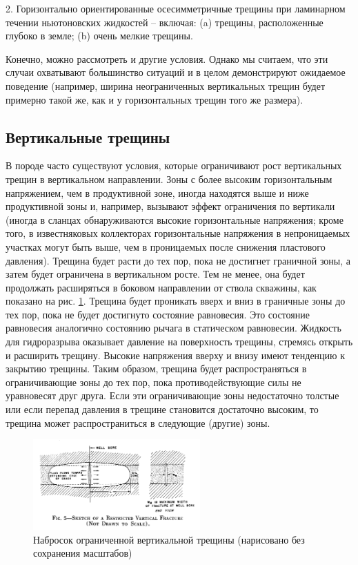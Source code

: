 \documentclass[a4paper, 12pt]{article}
\begin{document}
2. Горизонтально ориентированные осесимметричные трещины при ламинарном течении ньютоновских жидкостей -- включая: (a) трещины, расположенные глубоко в земле; (b) очень мелкие трещины.

Конечно, можно рассмотреть и другие условия.
Однако мы считаем, что эти случаи охватывают большинство ситуаций и в целом демонстрируют ожидаемое поведение
(например, ширина неограниченных вертикальных трещин будет примерно такой же, как и у горизонтальных трещин того же размера).

\subsection{Вертикальные трещины}

В породе часто существуют условия, которые ограничивают рост вертикальных трещин в вертикальном направлении.
Зоны с более высоким горизонтальным напряжением, чем в продуктивной зоне, иногда находятся выше и ниже продуктивной зоны и, например, вызывают эффект ограничения по вертикали
(иногда в сланцах обнаруживаются высокие горизонтальные напряжения; кроме того, в известняковых коллекторах горизонтальные напряжения в непроницаемых участках могут быть выше, чем в проницаемых после снижения пластового давления).
Трещина будет расти до тех пор, пока не достигнет граничной зоны, а затем будет ограничена в вертикальном росте.
Тем не менее, она будет продолжать расширяться в боковом направлении от ствола скважины, как показано на рис. \ref{fig:Perkins5}.
Трещина будет проникать вверх и вниз в граничные зоны до тех пор, пока не будет достигнуто состояние равновесия.
Это состояние равновесия аналогично состоянию рычага в статическом равновесии.
Жидкость для гидроразрыва оказывает давление на поверхность трещины, стремясь открыть и расширить трещину.
Высокие напряжения вверху и внизу имеют тенденцию к закрытию трещины.
Таким образом, трещина будет распространяться в ограничивающие зоны до тех пор, пока противодействующие силы не уравновесят друг друга.
Если эти ограничивающие зоны недостаточно толстые или если перепад давления в трещине становится достаточно высоким, то трещина может распространиться в следующие (другие) зоны.

\begin{figure}[H]
\center
\includegraphics[width=0.57\textwidth]{Perkins_5}
\caption{Набросок ограниченной вертикальной трещины (нарисовано без сохранения масштабов)}
\label{fig:Perkins5}
\end{figure}
\end{document}
